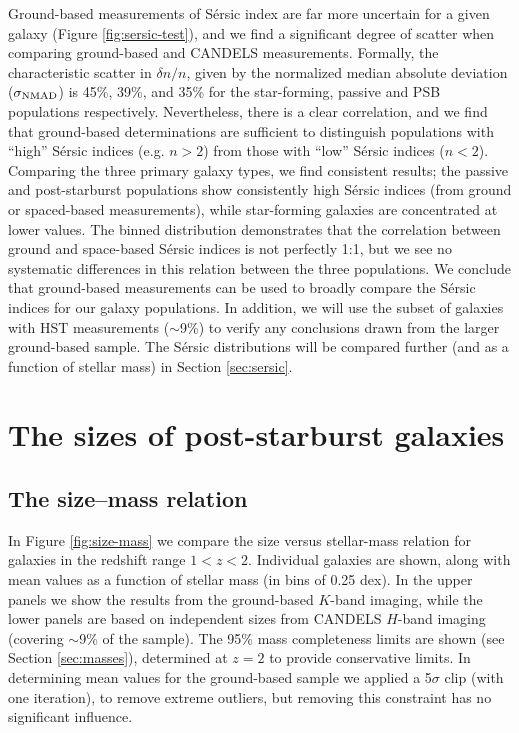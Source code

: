 \documentclass[a4paper,fleqn,usenatbib,useAMS]{mnras}
\begin{document}
Ground-based measurements of S\'{e}rsic index are far more uncertain
for a given galaxy (Figure \ref{fig:sersic-test}), and we find a
significant degree of scatter when comparing ground-based and CANDELS
measurements.  Formally, the characteristic scatter in $\delta n/n$,
given by the normalized median absolute deviation ($\sigma_{{\rm
    NMAD}}$) is 45\%, 39\%, and 35\% for the star-forming, passive and
PSB populations respectively.  Nevertheless, there is a clear
correlation, and we find that ground-based determinations are
sufficient to distinguish populations with ``high'' S\'{e}rsic indices
(e.g. $n>2$) from those with ``low'' S\'{e}rsic indices
($n<2$). Comparing the three primary galaxy types, we find consistent
results; the passive and post-starburst populations show consistently
high S\'{e}rsic indices (from ground or spaced-based measurements),
while star-forming galaxies are concentrated at lower values.  The binned
distribution demonstrates that the correlation between ground and
space-based S\'{e}rsic indices is not perfectly 1:1, but we see no
systematic differences in this relation between the three populations.
We conclude that ground-based measurements can be used to broadly
compare the S\'{e}rsic indices for our galaxy populations. In
addition, we will use the subset of galaxies with HST measurements
($\sim$9\%) to verify any conclusions drawn from the larger
ground-based sample.  The S\'{e}rsic distributions will be compared
further (and as a function of stellar mass) in Section
\ref{sec:sersic}.



\section{The sizes of post-starburst galaxies}
\subsection{The size--mass relation}
\label{sec:sizemass}


In Figure \ref{fig:size-mass} we compare the size versus stellar-mass
relation for galaxies in the redshift range $1<z<2$. Individual
galaxies are shown, along with mean values as a function of stellar
mass (in bins of 0.25 dex).  In the upper panels we show the results
from the ground-based $K$-band imaging, while the lower panels are
based on independent sizes from CANDELS $H$-band imaging (covering
$\sim$9\% of the sample).  The 95\% mass completeness limits are shown
(see Section \ref{sec:masses}), determined at $z=2$ to provide
conservative limits.  In determining mean values for the ground-based
sample we applied a 5$\sigma$ clip (with one iteration), to remove
extreme outliers, but removing this constraint has no significant
influence.
\end{document}
